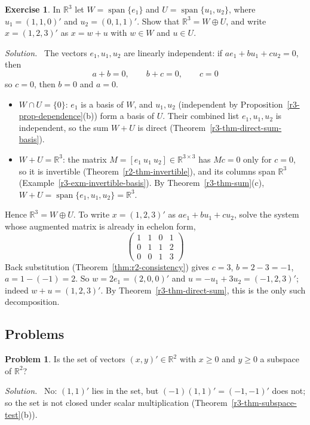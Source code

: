 \documentclass[12pt]{article}
\newcommand{\R}{\mathbb R}
\DeclareMathOperator{\Span}{span}
\theoremstyle{definition}
\newtheorem{exercise}{Exercise}
\newtheorem{problem}{Problem}
\newenvironment{solution}{\par\noindent\textit{Solution.}\ }{\par\smallskip}
\begin{document}
\begin{exercise}\label{r3-ex-direct-sum-r3}
In \(\R^3\) let \(W=\Span\{e_1\}\) and \(U=\Span\{u_1,u_2\}\), where \(u_1=(1,1,0)'\) and
\(u_2=(0,1,1)'\). Show that \(\R^3=W\oplus U\), and write \(x=(1,2,3)'\) as \(x=w+u\) with
\(w\in W\) and \(u\in U\).
\end{exercise}
\begin{solution}
The vectors \(e_1,u_1,u_2\) are linearly independent: if \(ae_1+bu_1+cu_2=0\), then
\[
a+b=0,\qquad b+c=0,\qquad c=0
\]
so \(c=0\), then \(b=0\) and \(a=0\).
\begin{itemize}
\item \(W\cap U=\{0\}\): \(e_1\) is a basis of \(W\), and \(u_1,u_2\) (independent by
Proposition~\ref{r3-prop-dependence}(b)) form a basis of \(U\). Their combined list
\(e_1,u_1,u_2\) is independent, so the sum \(W+U\) is direct
(Theorem~\ref{r3-thm-direct-sum-basis}).
\item \(W+U=\R^3\): the matrix \(M=[e_1\ u_1\ u_2]\in\R^{3\times3}\) has \(Mc=0\) only for
\(c=0\), so it is invertible (Theorem~\ref{r2-thm-invertible}), and its columns span \(\R^3\)
(Example~\ref{r3-exm-invertible-basis}). By Theorem~\ref{r3-thm-sum}(c),
\(W+U=\Span\{e_1,u_1,u_2\}=\R^3\).
\end{itemize}
Hence \(\R^3=W\oplus U\). To write \(x=(1,2,3)'\) as \(ae_1+bu_1+cu_2\), solve the system whose
augmented matrix is already in echelon form,
\[
\left(\begin{array}{ccc|c}1&1&0&1\\0&1&1&2\\0&0&1&3\end{array}\right)
\]
Back substitution (Theorem~\ref{thm:r2-consistency}) gives \(c=3\), \(b=2-3=-1\),
\(a=1-(-1)=2\). So \(w=2e_1=(2,0,0)'\) and \(u=-u_1+3u_2=(-1,2,3)'\); indeed
\(w+u=(1,2,3)'\). By Theorem~\ref{r3-thm-direct-sum}, this is the only such decomposition.
\end{solution}

\subsection*{Problems}

\begin{problem}\label{r3-ex-subsets-r2}
Is the set of vectors \((x,y)'\in\R^2\) with \(x\geqslant0\) and \(y\geqslant0\) a subspace of
\(\R^2\)?
\end{problem}
\begin{solution}
No: \((1,1)'\) lies in the set, but \((-1)(1,1)'=(-1,-1)'\) does not; so the set is not closed
under scalar multiplication (Theorem~\ref{r3-thm-subspace-test}(b)).
\end{solution}
\end{document}
